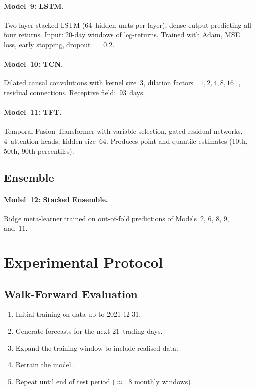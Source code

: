 \documentclass[11pt,a4paper,twocolumn]{article}
\begin{document}
\paragraph{Model~9: LSTM.}
Two-layer stacked LSTM (64~hidden units per layer), dense output predicting all
four returns.  Input: 20-day windows of log-returns.  Trained with Adam, MSE
loss, early stopping, dropout~$= 0.2$.

\paragraph{Model~10: TCN.}
Dilated causal convolutions with kernel size~3, dilation factors
$[1,2,4,8,16]$, residual connections.  Receptive field:~93~days.

\paragraph{Model~11: TFT.}
Temporal Fusion Transformer with variable selection, gated residual networks,
4~attention heads, hidden size~64.  Produces point and quantile estimates
(10th, 50th, 90th percentiles).

\subsection{Ensemble}

\paragraph{Model~12: Stacked Ensemble.}
Ridge meta-learner trained on out-of-fold predictions of Models~2, 6, 8, 9,
and~11.


\section{Experimental Protocol}\label{sec:protocol}

\subsection{Walk-Forward Evaluation}

\begin{enumerate}[leftmargin=*,itemsep=1pt]
    \item Initial training on data up to 2021-12-31.
    \item Generate forecasts for the next 21~trading days.
    \item Expand the training window to include realised data.
    \item Retrain the model.
    \item Repeat until end of test period (${\approx}\,18$ monthly windows).
\end{enumerate}
\end{document}
